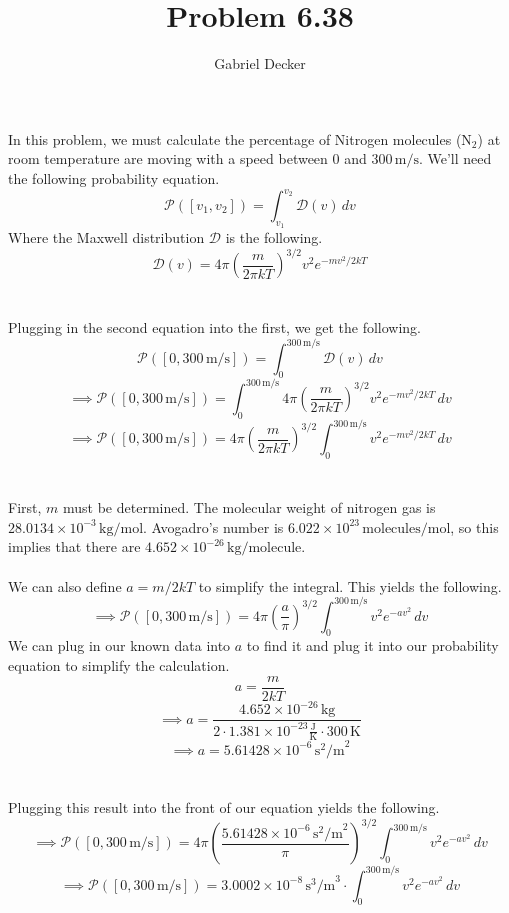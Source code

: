 \documentclass[12pt]{article}
\title{Problem 6.38}
\author{Gabriel Decker}
\newcommand{\boltzmannConstK}{1.381\times10^{-23}\frac{\text{J}}{\text{K}}}
\begin{document}
\maketitle
\begin{flushleft}


In this problem, we must calculate the percentage of Nitrogen molecules (N$_2$) at room temperature are moving with a speed between 0 and $300\,\text{m/s}$.
We'll need the following probability equation.
\begin{equation}
    \mathcal{P}([v_1,v_2])=\int_{v_1}^{v_2}\mathcal{D}(v)\,dv
\end{equation}
Where the Maxwell distribution $\mathcal{D}$ is the following.
\begin{equation}
    \mathcal{D}(v)=4\pi\left(\frac{m}{2\pi kT}\right)^{3/2}v^2e^{-mv^2/2kT}
\end{equation}\\~\\

Plugging in the second equation into the first, we get the following.
$$\mathcal{P}([0,300\,\text{m/s}])=\int_0^{300\,\text{m/s}}\mathcal{D}(v)\,dv$$
$$\implies\mathcal{P}([0,300\,\text{m/s}])=\int_0^{300\,\text{m/s}}4\pi\left(\frac{m}{2\pi kT}\right)^{3/2}v^2e^{-mv^2/2kT}\,dv$$
$$\implies\mathcal{P}([0,300\,\text{m/s}])=4\pi\left(\frac{m}{2\pi kT}\right)^{3/2}\int_0^{300\,\text{m/s}}v^2e^{-mv^2/2kT}\,dv$$\\~\\

First, $m$ must be determined. The molecular weight of nitrogen gas is $28.0134\times10^{-3}\,\text{kg/mol}$.
Avogadro's number is $6.022\times10^{23}\,\text{molecules/mol}$, so this implies that there are $4.652\times10^{-26}\,\text{kg/molecule}$.\\~\\

We can also define $a=m/2kT$ to simplify the integral. This yields the following.
$$\implies\mathcal{P}([0,300\,\text{m/s}])=4\pi\left(\frac{a}{\pi}\right)^{3/2}\int_0^{300\,\text{m/s}}v^2e^{-av^2}\,dv$$
We can plug in our known data into $a$ to find it and plug it into our probability equation to simplify the calculation.
$$a=\frac{m}{2kT}$$
$$\implies a=\frac{4.652\times10^{-26}\,\text{kg}}{2\cdot\boltzmannConstK\cdot300\,\text{K}}$$
$$\implies a=5.61428\times10^{-6}\,\text{s}^2\text{/m}^2$$\\~\\

Plugging this result into the front of our equation yields the following.
$$\implies\mathcal{P}([0,300\,\text{m/s}])=4\pi\left(\frac{5.61428\times10^{-6}\,\text{s}^2\text{/m}^2}{\pi}\right)^{3/2}\int_0^{300\,\text{m/s}}v^2e^{-av^2}\,dv$$
$$\implies\mathcal{P}([0,300\,\text{m/s}])=3.0002\times10^{-8}\,\text{s}^3\text{/m}^3\cdot\int_0^{300\,\text{m/s}}v^2e^{-av^2}\,dv$$\\~\\


\end{flushleft}
\end{document}
